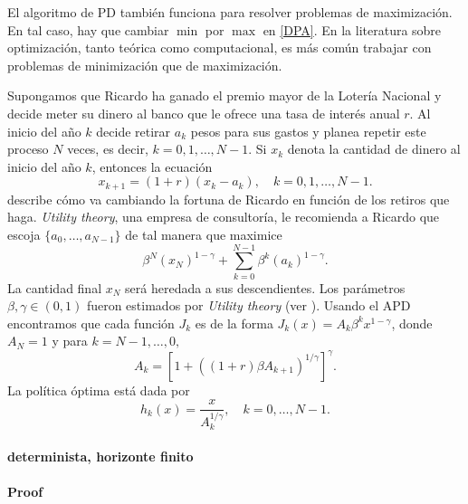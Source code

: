 \begin{obs} 
		El algoritmo de PD también funciona para resolver problemas de 
	maximización. En tal caso, hay que cambiar $\min$ por $\max$ en \eqref{DPA}. 
	En la literatura sobre optimización, tanto teórica como computacional, es más 
	común trabajar con problemas de minimización que de maximización. 
\end{obs}%

\begin{ejem} 
		Supongamos que Ricardo %
	ha ganado el premio mayor de la Lotería Nacional y decide 
	meter su dinero al banco que le ofrece una tasa de interés anual $r$. Al 
	inicio del año $k$ decide retirar $a_k$ pesos para sus gastos y planea 
	repetir este proceso $N$ veces, es decir, $k=0,1,\ldots,N-1$. Si $x_k$ 
	denota la cantidad de dinero al inicio del año $k$, entonces la ecuación
	\begin{equation}\label{DynConInv}
		x_{k+1}=(1+r)(x_k-a_k), \quad k=0,1,\ldots,N-1.
	\end{equation}
	describe cómo va cambiando la fortuna de Ricardo en función de los retiros 
que 
	haga. {\it Utility theory}, una empresa de consultoría, le recomienda a 
	Ricardo que escoja $\{a_0,\ldots,a_{N-1}\}$ de tal manera que maximice
	\begin{equation}\label{ObjFuConInv}
      \beta^N(x_N)^{1-\gamma}+\sum_{k=0}^{N-1}\beta^k(a_k)^{1-\gamma}.
	\end{equation}
	La cantidad final $x_N$ será heredada a sus descendientes. Los parámetros 
  $\beta,\gamma\in(0,1)$ fueron estimados por {\it Utility theory} 
  (ver \cite{Fishburn}).
	Usando el APD encontramos que cada función $J_k$ es de la forma 
  $J_k(x) = A_k\beta^kx^{1-\gamma}$, donde $A_N=1$ y para $k=N-1,\ldots,0,$  
  \[ A_k=[1+((1+r)\beta A_{k+1})^{1/\gamma}]^{\gamma}.\]
		La política óptima está dada por 
  \[ 
		 h_k(x)=\frac{x}{A_{k}^{1/\gamma}},\quad k=0,\ldots,N-1.  
	\]
\end{ejem}
\paragraph{determinista, horizonte finito}
\paragraph{Proof}
